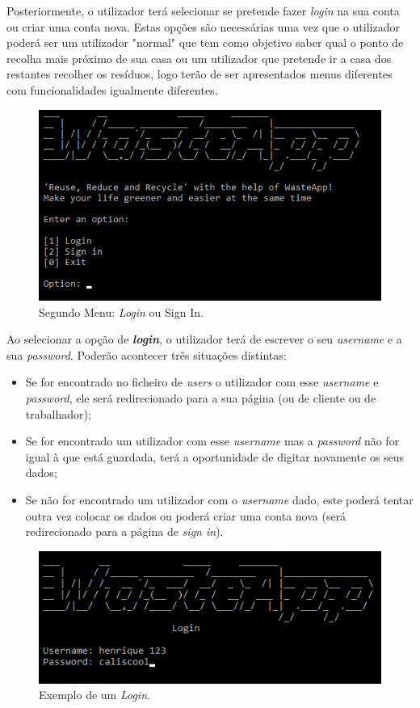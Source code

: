 \documentclass[article, a4paper, 12pt, oneside]{memoir}
\begin{document}
Posteriormente, o utilizador terá selecionar se pretende fazer \textit{login} na sua conta ou criar uma conta nova. Estas opções são necessárias uma vez que o utilizador poderá ser um utilizador "normal" que tem como objetivo saber qual o ponto de recolha mais próximo de sua casa ou um utilizador que pretende ir a casa dos restantes recolher os resíduos, logo terão de ser apresentados menus diferentes com funcionalidades igualmente diferentes.

\begin{figure}[h!]
  \centerline{\includegraphics[scale=0.8]{wasteapp_2ndmenu.png}}
  \caption{Segundo Menu: \textit{Login} ou Sign In.}
\end{figure}

Ao selecionar a opção de \textbf{\textit{login}}, o utilizador terá de escrever o seu \textit{username} e a sua \textit{password}. Poderão acontecer três situações distintas:

\begin{itemize}
	\item Se for encontrado no ficheiro de \textit{users} o utilizador com esse \textit{username} e \textit{password}, ele será redirecionado para a sua página (ou de cliente ou de trabalhador);
	\item Se for encontrado um utilizador com esse \textit{username} mas a \textit{password} não for igual à que está guardada, terá a oportunidade de digitar novamente os seus dados;
	\item Se não for encontrado um utilizador com o \textit{username} dado, este poderá tentar outra vez colocar os dados ou poderá criar uma conta nova (será redirecionado para a página de \textit{sign in}).
\end{itemize}

\begin{figure}[h!]
  \centerline{\includegraphics[scale=0.8]{wasteapp_login.png}}
  \caption{Exemplo de um \textit{Login}.}
\end{figure}
\end{document}
